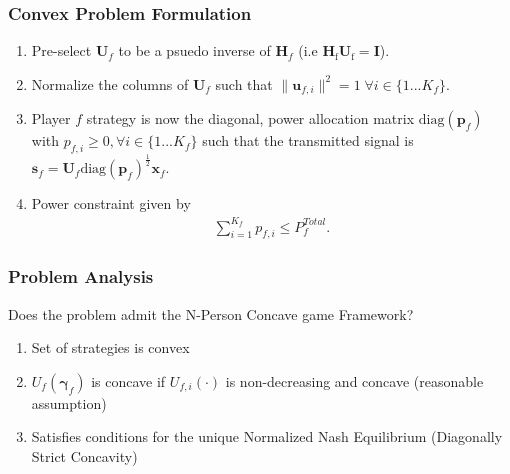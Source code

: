 \documentclass[10pt,tgadventor, onlymath]{beamer}
\begin{document}
\begin{frame}
\frametitle{Convex Problem Formulation}
\begin{enumerate}
\setlength\itemsep{2em}
\item Pre-select $\mathbf{U}_f$ to be a psuedo inverse of $\mathbf{H}_f$  (i.e $\mathbf{H}_\mathrm{f}\mathbf{U}_\mathrm{f} = \mathbf{I}$).
\item 
	Normalize the columns of $\mathbf{U}_{f}$ such that 
	 $\|\mathbf{u}_{f,i}\|^2 =1 \;\forall i \in \{1 ... K_{f}\}$.
\item 
	Player $f$ strategy is now the diagonal, power allocation  	
	matrix $\mathrm{diag}(\mathbf{p}_{f})$ with $p_{f,i} \geq 0, \forall i \in \{1 ... K_{f}\}$
such that the transmitted 		
	signal is 
	$\mathbf{s}_{f	}= \mathbf{U}_{f} 
	\mathrm{diag}(\mathbf{p}_{f})^{\frac{1}{2}}
	\mathbf{x}_{f}$.
\item 
	Power constraint given by 
	\begin{gather*}
	\sum_{i=1}^{K_{f}} p_{f,i}
	  \leq P^{Total}_{f}.
	  	\end{gather*}
\end{enumerate}
\end{frame}

\begin{frame}
\frametitle{Problem Analysis}
Does the problem admit the N-Person Concave game Framework? 
\\
\begin{enumerate}
\setlength\itemsep{2em}
\item  Set of strategies is convex \faThumbsOUp
\item  $U_{f}(\boldsymbol{\gamma}_{f})$ is concave if 
	$U_{f,i}(\cdot)$ is non-decreasing and concave (reasonable assumption) \faThumbsOUp
\item 
	Satisfies conditions for the unique Normalized Nash Equilibrium (Diagonally Strict Concavity)  \faThumbsOUp
\end{enumerate}

\end{frame}
\end{document}

